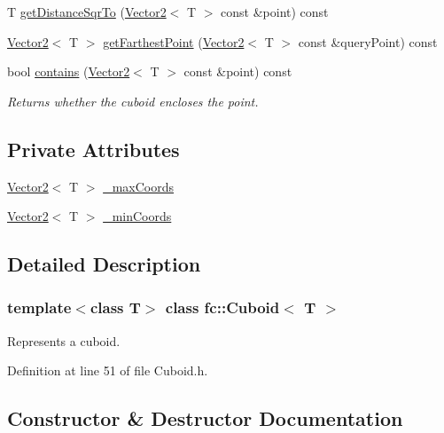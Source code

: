 \begin{DoxyCompactItemize}
\item 
T \hyperlink{classfc_1_1Cuboid_a48625b32d20a38c95dca655b7d7334d8}{get\+Distance\+Sqr\+To} (\hyperlink{classfc_1_1Vector2}{Vector2}$<$ T $>$ const \&point) const
\item 
\hyperlink{classfc_1_1Vector2}{Vector2}$<$ T $>$ \hyperlink{classfc_1_1Cuboid_add357a628839e98f3dbca1b6d4ca9700}{get\+Farthest\+Point} (\hyperlink{classfc_1_1Vector2}{Vector2}$<$ T $>$ const \&query\+Point) const
\item 
bool \hyperlink{classfc_1_1Cuboid_a5b35e4a5396bab2eeac385435bd301b3}{contains} (\hyperlink{classfc_1_1Vector2}{Vector2}$<$ T $>$ const \&point) const
\begin{DoxyCompactList}\small\item\em Returns whether the cuboid encloses the point. \end{DoxyCompactList}\end{DoxyCompactItemize}
\subsection*{Private Attributes}
\begin{DoxyCompactItemize}
\item 
\hyperlink{classfc_1_1Vector2}{Vector2}$<$ T $>$ \hyperlink{classfc_1_1Cuboid_aab1d4e15fc3fae228605ff133a50acff}{\+\_\+max\+Coords}
\item 
\hyperlink{classfc_1_1Vector2}{Vector2}$<$ T $>$ \hyperlink{classfc_1_1Cuboid_a79231769f23e7ebeb5769e789ff5d90c}{\+\_\+min\+Coords}
\end{DoxyCompactItemize}


\subsection{Detailed Description}
\subsubsection*{template$<$class T$>$\newline
class fc\+::\+Cuboid$<$ T $>$}

Represents a cuboid. 

Definition at line 51 of file Cuboid.\+h.



\subsection{Constructor \& Destructor Documentation}
\mbox{\label{classfc_1_1Cuboid_a29d8864327254cacd68ce463b4a258f9}} 
